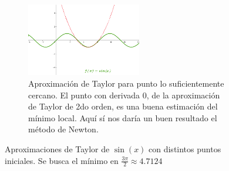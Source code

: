 \documentclass[11pt,a4paper]{article}
\theoremstyle{definition}
\begin{document}
	\begin{figure}[H]
	\ContinuedFloat
	\centering
	\begin{subfigure}{\textwidth}
		\includegraphics[width=0.55\textwidth]{images/ilus_newton3}
		\caption{Aproximación de Taylor para punto lo suficientemente cercano. El punto con derivada 0, de la aproximación de Taylor de 2do orden, es una buena estimación del mínimo local. Aquí sí nos daría un buen resultado el método de Newton. }
	\end{subfigure}
	\caption{Aproximaciones de Taylor de $\sin(x)$ con distintos puntos iniciales. Se busca el mínimo en $\frac{3\pi}{2} \approx 4.7124$}
	\end{figure}
	
\end{document}
